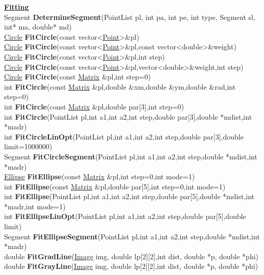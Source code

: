 \documentclass[10pt,titlepage]{article}
\newcommand{\subtitle}[1]{{\noindent\bf#1}}
\def\functionlistentry#1#2#3#4#5#6{\noindent #1 {\bf #2}(#3) \dotfill #6\\}
\begin{document}
{{\subtitle{\hyperlink{SECTION:fitting}{Fitting}}\\
\functionlistentry{Segment}{DetermineSegment}{PointList pl, int pa, int pe, int type, Segment sl, int* ma, double* md}{1188}{fitting}{}
\functionlistentry{\hyperlink{Circle}{Circle}}{FitCircle}{const vector\textless {}\hyperlink{Point}{Point}\textgreater  \&pl}{1168}{fitting}{}
\functionlistentry{\hyperlink{Circle}{Circle}}{FitCircle}{const vector\textless {}\hyperlink{Point}{Point}\textgreater  \&pl,const vector\textless {}double\textgreater  \&weight}{1169}{fitting}{}
\functionlistentry{\hyperlink{Circle}{Circle}}{FitCircle}{const vector\textless {}\hyperlink{Point}{Point}\textgreater  \&pl,int step}{1170}{fitting}{}
\functionlistentry{\hyperlink{Circle}{Circle}}{FitCircle}{const vector\textless {}\hyperlink{Point}{Point}\textgreater  \&pl,vector\textless {}double\textgreater  \&weight,int step}{1171}{fitting}{}
\functionlistentry{\hyperlink{Circle}{Circle}}{FitCircle}{const \hyperlink{Matrix}{Matrix} \&pl,int step=0}{1172}{fitting}{}
\functionlistentry{int}{FitCircle}{const \hyperlink{Matrix}{Matrix} \&pl,double \&xm,double \&ym,double \&rad,int step=0}{1173}{fitting}{}
\functionlistentry{int}{FitCircle}{const \hyperlink{Matrix}{Matrix} \&pl,double par[3],int step=0}{1174}{fitting}{}
\functionlistentry{int}{FitCircle}{PointList pl,int a1,int a2,int step,double par[3],double *mdist,int *madr}{1175}{fitting}{}
\functionlistentry{int}{FitCircleLinOpt}{PointList pl,int a1,int a2,int step,double par[3],double limit=1000000}{1176}{fitting}{}
\functionlistentry{Segment}{FitCircleSegment}{PointList pl,int a1,int a2,int step,double *mdist,int *madr}{1182}{fitting}{}
\functionlistentry{\hyperlink{Ellipse}{Ellipse}}{FitEllipse}{const \hyperlink{Matrix}{Matrix} \&pl,int step=0,int mode=1}{1177}{fitting}{}
\functionlistentry{int}{FitEllipse}{const \hyperlink{Matrix}{Matrix} \&pl,double par[5],int step=0,int mode=1}{1178}{fitting}{}
\functionlistentry{int}{FitEllipse}{PointList pl,int a1,int a2,int step,double par[5],double *mdist,int *madr,int mode=1}{1179}{fitting}{}
\functionlistentry{int}{FitEllipseLinOpt}{PointList pl,int a1,int a2,int step,double par[5],double limit}{1180}{fitting}{}
\functionlistentry{Segment}{FitEllipseSegment}{PointList pl,int a1,int a2,int step,double *mdist,int *madr}{1183}{fitting}{}
\functionlistentry{double}{FitGradLine}{\hyperlink{Image}{Image} img, double lp[2][2],int dist, double *p, double *phi}{1192}{fitting}{}
\functionlistentry{double}{FitGrayLine}{\hyperlink{Image}{Image} img, double lp[2][2],int dist, double *p, double *phi}{1191}{fitting}{}
}}
\end{document}
